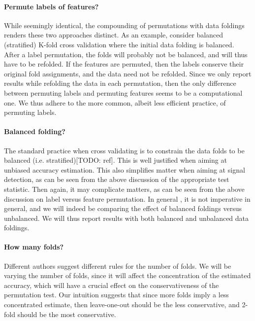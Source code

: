 \documentclass{pnastwo}
\begin{document}
\begin{article}
\begin{description}
\paragraph{Permute labels of features?}
While seemingly identical, the compounding of permutations with data foldings renders these two approaches distinct. 
As an example, consider balanced (stratified) K-fold cross validation where the initial data folding is balanced. 
After a label permutation, the folds will probably not be balanced, and will thus have to be refolded. 
If the features are permuted, then the labels conserve their original fold assignments, and the data need not be refolded. 
Since we only report results while refolding the data in each permutation, then the only difference between permuting labels and permuting features seems to be a computational one. 
We thus adhere to the more common, albeit less efficient practice, of permuting labels. 


\paragraph{Balanced folding?}
The standard practice when cross validating is to constrain the data folds to be balanced (i.e. stratified)[TODO: ref].
This is well justified when aiming at unbiased accuracy estimation. 
This also simplifies matter when aiming at signal detection, as can be seen from the above discussion of the appropriate test statistic. 
Then again, it may complicate matters, as can be seen from the above discussion on label versus feature permutation. 
In general , it is not imperative in general, and we will indeed be comparing the effect of balanced foldings versus unbalanced. 
We will thus report results with both balanced and unbalanced data foldings. 


\paragraph{How many folds?}
Different authors suggest different rules for the number of folds. 
We will be varying the number of folds, since it will affect the concentration of the estimated accuracy, which will have a crucial effect on the conservativeness of the permutation test. 
Our intuition suggests that since more folds imply a less concentrated estimate, then leave-one-out should be the less conservative, and 2-fold should be the most conservative. 

\end{description}





\end{article}
\end{document}
